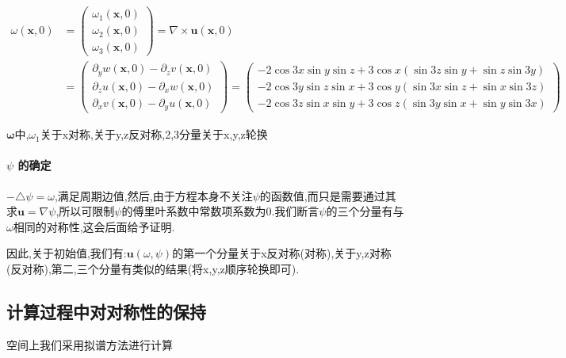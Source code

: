 \documentclass[UTF8]{ctexart}
\begin{document}
    \begin{equation*}
  \begin{split}
      \omega(\mathbf{x},0)&= \left(\begin{matrix}
                          \omega_1(\mathbf{x},0) \\
                          \omega_2(\mathbf{x},0) \\
                          \omega_3(\mathbf{x},0)
                        \end{matrix}\right) =\nabla \times \mathbf{u}(\mathbf{x},0)  \\
                       & =\left(\begin{matrix}
                          \partial_y w(\mathbf{x},0) -\partial_z v(\mathbf{x},0) \\
                          \partial_z u(\mathbf{x},0) -\partial_x w(\mathbf{x},0) \\
                          \partial_x v(\mathbf{x},0) -\partial_y u(\mathbf{x},0)
                        \end{matrix}\right)
                          = \left(\begin{matrix}
                          -2\cos 3x\sin y\sin z + 3\cos x (\sin 3z\sin y + \sin z \sin 3y) \\
                          -2\cos 3y\sin z\sin x + 3\cos y (\sin 3x\sin z + \sin x \sin 3z) \\
                          -2\cos 3z\sin x\sin y + 3\cos z (\sin 3y\sin x + \sin y \sin 3x)
                        \end{matrix}\right)
  \end{split}
  \end{equation*}

$\mathbf{\omega}$中,$\omega_1$关于x对称,关于y,z反对称,2,3分量关于x,y,z轮换

\paragraph{$\psi$ 的确定}
$-\triangle \psi = \omega$,满足周期边值,然后,由于方程本身不关注$\psi$的函数值,而只是需要通过其求$\mathbf{u}=\nabla \psi$,所以可限制$\psi$的傅里叶系数中常数项系数为0.我们断言$\psi$的三个分量有与$\omega$相同的对称性,这会后面给予证明.


因此,关于初始值,我们有:$\mathbf{u}(\omega,\psi)$的第一个分量关于x反对称(对称),关于y,z对称(反对称),第二,三个分量有类似的结果(将x,y,z顺序轮换即可).


\subsection{计算过程中对对称性的保持}
空间上我们采用拟谱方法进行计算
\end{document}
